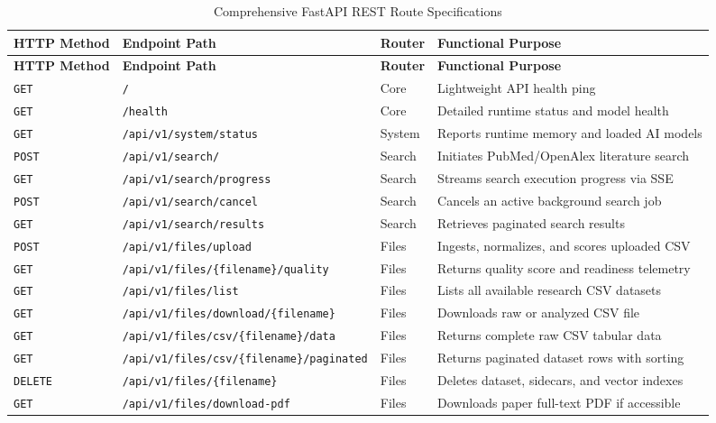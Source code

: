 \begin{longtable}{l p{5.5cm} p{2.2cm} X}
\caption{Comprehensive FastAPI REST Route Specifications} \label{tab:api_route_inventory} \\
\toprule
\textbf{HTTP Method} & \textbf{Endpoint Path} & \textbf{Router} & \textbf{Functional Purpose} \\
\midrule
\endfirsthead
\toprule
\textbf{HTTP Method} & \textbf{Endpoint Path} & \textbf{Router} & \textbf{Functional Purpose} \\
\midrule
\endhead
\bottomrule
\endfoot
\texttt{GET} & \texttt{/} & Core & Lightweight API health ping \\
\texttt{GET} & \texttt{/health} & Core & Detailed runtime status and model health \\
\texttt{GET} & \texttt{/api/v1/system/status} & System & Reports runtime memory and loaded AI models \\
\midrule
\texttt{POST} & \texttt{/api/v1/search/} & Search & Initiates PubMed/OpenAlex literature search \\
\texttt{GET} & \texttt{/api/v1/search/progress} & Search & Streams search execution progress via SSE \\
\texttt{POST} & \texttt{/api/v1/search/cancel} & Search & Cancels an active background search job \\
\texttt{GET} & \texttt{/api/v1/search/results} & Search & Retrieves paginated search results \\
\midrule
\texttt{POST} & \texttt{/api/v1/files/upload} & Files & Ingests, normalizes, and scores uploaded CSV \\
\texttt{GET} & \texttt{/api/v1/files/\{filename\}/quality} & Files & Returns quality score and readiness telemetry \\
\texttt{GET} & \texttt{/api/v1/files/list} & Files & Lists all available research CSV datasets \\
\texttt{GET} & \texttt{/api/v1/files/download/\{filename\}} & Files & Downloads raw or analyzed CSV file \\
\texttt{GET} & \texttt{/api/v1/files/csv/\{filename\}/data} & Files & Returns complete raw CSV tabular data \\
\texttt{GET} & \texttt{/api/v1/files/csv/\{filename\}/paginated} & Files & Returns paginated dataset rows with sorting \\
\texttt{DELETE} & \texttt{/api/v1/files/\{filename\}} & Files & Deletes dataset, sidecars, and vector indexes \\
\texttt{GET} & \texttt{/api/v1/files/download-pdf} & Files & Downloads paper full-text PDF if accessible \\

\end{longtable}
